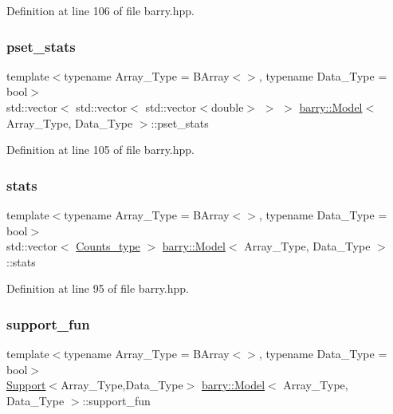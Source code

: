 Definition at line 106 of file barry.\+hpp.

\mbox{\label{classbarry_1_1_model_aac69044ccc599e83ed2910d93cc135e9}} 
\subsubsection{\texorpdfstring{pset\+\_\+stats}{pset\_stats}}
{\footnotesize\ttfamily template$<$typename Array\+\_\+\+Type  = B\+Array$<$$>$, typename Data\+\_\+\+Type  = bool$>$ \\
std\+::vector$<$ std\+::vector$<$ std\+::vector$<$double$>$ $>$ $>$ \hyperlink{classbarry_1_1_model}{barry\+::\+Model}$<$ Array\+\_\+\+Type, Data\+\_\+\+Type $>$\+::pset\+\_\+stats}



Definition at line 105 of file barry.\+hpp.

\mbox{\label{classbarry_1_1_model_a5e74e613d0e4b9fef01bba0d196fcfe6}} 
\subsubsection{\texorpdfstring{stats}{stats}}
{\footnotesize\ttfamily template$<$typename Array\+\_\+\+Type  = B\+Array$<$$>$, typename Data\+\_\+\+Type  = bool$>$ \\
std\+::vector$<$ \hyperlink{namespacebarry_a3e2d8c3b6cf602107559d4237d9f1315}{Counts\+\_\+type} $>$ \hyperlink{classbarry_1_1_model}{barry\+::\+Model}$<$ Array\+\_\+\+Type, Data\+\_\+\+Type $>$\+::stats}



Definition at line 95 of file barry.\+hpp.

\mbox{\label{classbarry_1_1_model_aa40caa45d0d8ca5d0f16e8dadb0db5ce}} 
\subsubsection{\texorpdfstring{support\+\_\+fun}{support\_fun}}
{\footnotesize\ttfamily template$<$typename Array\+\_\+\+Type  = B\+Array$<$$>$, typename Data\+\_\+\+Type  = bool$>$ \\
\hyperlink{classbarry_1_1_support}{Support}$<$Array\+\_\+\+Type,Data\+\_\+\+Type$>$ \hyperlink{classbarry_1_1_model}{barry\+::\+Model}$<$ Array\+\_\+\+Type, Data\+\_\+\+Type $>$\+::support\+\_\+fun}



